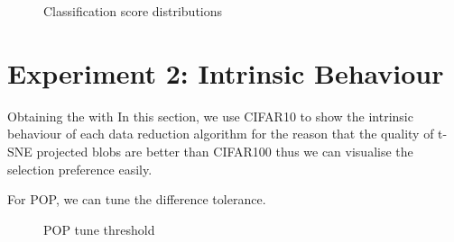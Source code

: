 \begin{figure}[H]
\centering  
{}
\caption{Classification score distributions}
\label{Fig.clscores}
\end{figure}





\section{Experiment 2: Intrinsic Behaviour}
Obtaining the  with  In this section, we use CIFAR10 to show the intrinsic behaviour of each data reduction algorithm for the reason that the quality of t-SNE projected blobs are better than CIFAR100 thus we can visualise the selection preference easily. 

For POP, we can tune the difference tolerance.   
\begin{figure}[H]
\centering  
{}
\caption{POP tune threshold}
\label{Fig.popcifar10}
\end{figure}

